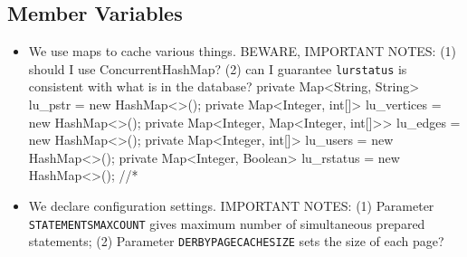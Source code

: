 \documentclass{article}
\def\nwendcode{\endtrivlist \endgroup}      %
\theoremstyle{definition}                   %
\begin{document}
\subsection{Member Variables}
\label{sec:member-variables}
\begin{itemize}
\item We use maps to cache various things. BEWARE, IMPORTANT NOTES: (1) should
I use ConcurrentHashMap? (2) can I guarantee {\tt{}\protect{}\protect{}lu{}rstatus} is consistent with
what is in the database?
\nwenddocs{}\endmoddef{}
private Map<String, String>               lu_pstr       = new HashMap<>();
private Map<Integer, int[]>               lu_vertices   = new HashMap<>();
private Map<Integer, Map<Integer, int[]>> lu_edges      = new HashMap<>();
private Map<Integer, int[]>               lu_users      = new HashMap<>();
private Map<Integer, Boolean>             lu_rstatus    = new HashMap<>();  //*
\eatline
{}\nwendcode{}\item We declare configuration settings. IMPORTANT NOTES: (1) Parameter
{\tt{}\protect{}STATEMENTS{}MAX{}COUNT} gives maximum number of simultaneous prepared
statements; (2) Parameter {\tt{}\protect{}DERBY{}PAGECACHESIZE} sets the size of each page?

\end{itemize}
\end{document}
